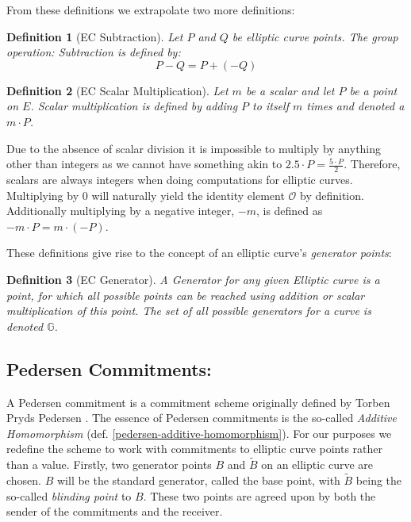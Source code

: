 \documentclass{article}
\newtheorem{definition}{Definition}[section]
\newcommand{\G}{\mathbb{G}}
\newcommand{\blind}[1]{\widetilde{#1}}
\newcommand{\bB}{\blind{B}}
\begin{document}
From these definitions we extrapolate two more definitions:

\begin{definition}[EC Subtraction]
	Let $P$ and $Q$ be elliptic curve points. The group operation:
	Subtraction is defined by:
	$$P-Q = P + (-Q)$$
\end{definition}

\begin{definition}[EC Scalar Multiplication]
	Let $m$ be a scalar and let $P$ be a point on $E$. Scalar
	multiplication is defined by adding $P$ to itself $m$ times
	and denoted a $m\cdot P$.
\end{definition}

Due to the absence of scalar division it is impossible to multiply by
anything other than integers as we cannot have something akin to $2.5
\cdot P = \frac{5\cdot P}{2}$. Therefore, scalars are always integers
when doing computations for elliptic curves. Multiplying by $0$ will
naturally yield the identity element $\mathcal{O}$ by definition.
Additionally multiplying by a negative integer, ${-m}$, is defined as
$-m\cdot P = m\cdot ({-P})$. 

These definitions give rise to the concept of an elliptic
curve's \textit{generator points}:

\begin{definition}[EC Generator]
	A Generator for any given Elliptic curve is a point, for
	which all possible points can be reached using addition or
	scalar multiplication of this point. The set of all possible
	generators for a curve is denoted $\G$.
\end{definition}

\subsection{Pedersen Commitments:} \label{pedersen-commitments}

A Pedersen commitment is a commitment scheme originally defined by
Torben Pryds Pedersen \cite{pedersen}. The essence of Pedersen
commitments is the so-called \textit{Additive Homomorphism}
(def. \ref{pedersen-additive-homomorphism}). For our purposes we
redefine the scheme to work with commitments to elliptic curve points
rather than a value. Firstly, two generator points $B$ and $\bB$
on an elliptic curve are chosen. $B$ will be the standard generator,
called the base point, with $\bB$ being the so-called \textit{blinding
point} to $B$. These two points are agreed upon by both the sender of
the commitments and the receiver.
\end{document}
